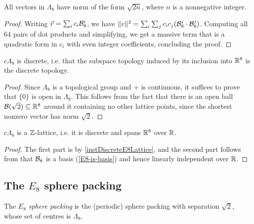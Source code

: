 \begin{lemma}\label{E8-vector-norms}\leanok
  All vectors in $\Lambda_8$ have norm of the form $\sqrt{2n}$, where $n$ is a nonnegative integer.
\end{lemma}
\begin{proof}
  Writing $\vec{v} = \sum_i c_i\mathcal{B}_8^i$, we have $\|v\|^2 = \sum_i \sum_j c_ic_j (\mathcal{B}_8^i \cdot \mathcal{B}_8^j)$. Computing all $64$ pairs of dot products and simplifying, we get a massive term that is a quadratic form in $c_i$ with even integer coefficients, concluding the proof.
\end{proof}

\begin{lemma}\label{instDiscreteE8Lattice}\leanok
  $c\Lambda_8$ is discrete, i.e. that the subspace topology induced by its inclusion into $\mathbb{R}^8$ is the discrete topology.
\end{lemma}
\begin{proof}
  Since $\Lambda_8$ is a topological group and $+$ is continuous, it suffices to prove that $\{0\}$ is open in $\Lambda_8$. This follows from the fact that there is an open ball $\mathcal{B}(\sqrt{2}) \subseteq \mathbb{R}^8$ around it containing no other lattice points, since the shortest nonzero vector has norm $\sqrt{2}$.
\end{proof}

\begin{lemma}\label{instLatticeE8}\leanok
  $c\Lambda_8$ is a $\mathbb{Z}$-lattice, i.e. it is discrete and spans $\mathbb{R}^8$ over $\mathbb{R}$.
\end{lemma}
\begin{proof}
  The first part is by \cref{instDiscreteE8Lattice}, and the second part follows from that $\mathcal{B}_8$ is a basis (\cref{E8-is-basis}) and hence linearly independent over $\mathbb{R}$.
\end{proof}


\subsection{The $E_8$ sphere packing}

\begin{definition}\label{E8Packing}\leanok
  The \emph{$E_8$ sphere packing} is the (periodic) sphere packing with separation $\sqrt{2}$, whose set of centres is $\Lambda_8$.
\end{definition}

